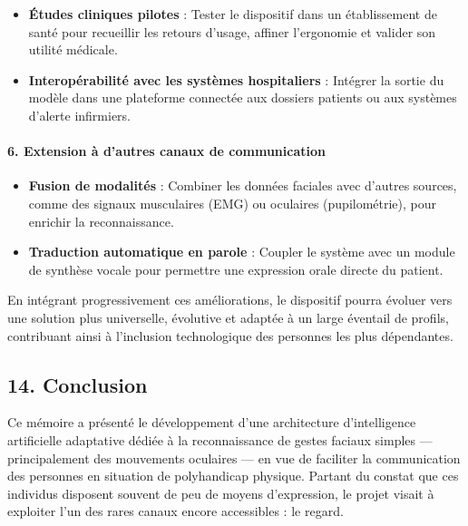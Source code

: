 \documentclass[
]{article}
\begin{document}
\begin{itemize}
\item
  \textbf{Études cliniques pilotes} : Tester le dispositif dans un établissement de santé pour recueillir les retours d'usage, affiner l'ergonomie et valider son utilité médicale.
\item
  \textbf{Interopérabilité avec les systèmes hospitaliers} : Intégrer la sortie du modèle dans une plateforme connectée aux dossiers patients ou aux systèmes d'alerte infirmiers.
\end{itemize}

\hypertarget{extension-uxe0-dautres-canaux-de-communication}{%
\paragraph{\texorpdfstring{\textbf{6. Extension à d'autres canaux de communication}}{6. Extension à d'autres canaux de communication}}\label{extension-uxe0-dautres-canaux-de-communication}}

\begin{itemize}
\item
  \textbf{Fusion de modalités} : Combiner les données faciales avec d'autres sources, comme des signaux musculaires (EMG) ou oculaires (pupilométrie), pour enrichir la reconnaissance.
\item
  \textbf{Traduction automatique en parole} : Coupler le système avec un module de synthèse vocale pour permettre une expression orale directe du patient.
\end{itemize}

En intégrant progressivement ces améliorations, le dispositif pourra évoluer vers une solution plus universelle, évolutive et adaptée à un large éventail de profils, contribuant ainsi à l'inclusion technologique des personnes les plus dépendantes.

\hypertarget{conclusion}{%
\subsection{14. Conclusion}\label{conclusion}}

Ce mémoire a présenté le développement d'une architecture d'intelligence artificielle adaptative dédiée à la reconnaissance de gestes faciaux simples --- principalement des mouvements oculaires --- en vue de faciliter la communication des personnes en situation de polyhandicap physique. Partant du constat que ces individus disposent souvent de peu de moyens d'expression, le projet visait à exploiter l'un des rares canaux encore accessibles : le regard.
\end{document}
